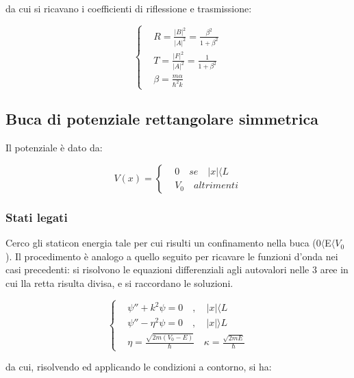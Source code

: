 \documentclass{report}
\begin{document}
da cui si ricavano i coefficienti di riflessione e trasmissione:

\begin{equation}
  \left\{
  \begin{aligned}
     & R= \frac{|B|^2}{|A|^2}= \frac{\beta^2}{1+\beta^2} \\
     & T= \frac{|F|^2}{|A|^2}= \frac{1}{1+\beta^2}       \\
     & \beta= \frac{m\alpha}{\hbar^2k}
  \end{aligned}
  \right.
\end{equation}

\subsection{Buca di potenziale rettangolare simmetrica}

Il potenziale è dato da:

\begin{equation}
  V(x)=
  \left\{
  \begin{aligned}
     & 0 \quad se \quad |x|\langle L \\
     & V_0 \quad altrimenti
  \end{aligned}
  \right.
\end{equation}

\subsubsection{Stati legati}
Cerco gli staticon energia tale per cui risulti un confinamento nella buca (0$\langle $E$\langle V_0$).
Il procedimento è analogo a quello seguito per ricavare le funzioni d'onda nei casi precedenti:
si risolvono le equazioni differenziali agli autovalori nelle 3 aree in cui lla retta risulta divisa, e si raccordano
le soluzioni.

\begin{equation}
  \left\{
  \begin{aligned}
     & \psi''+k^2\psi=0 \quad , \quad |x|\langle L                                 \\
     & \psi''-\eta^2\psi=0 \quad , \quad |x|\rangle L                              \\
     & \eta= \frac{\sqrt{2m(V_0-E)}}{\hbar} \quad \kappa= \frac{\sqrt{2mE}}{\hbar}
  \end{aligned}
  \right.
\end{equation}

da cui, risolvendo ed applicando le condizioni a contorno, si ha:
\end{document}
